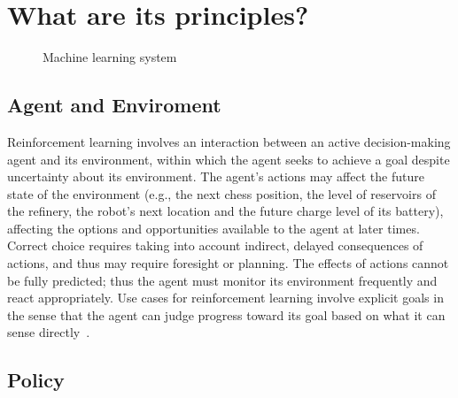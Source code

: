 \documentclass[letterpaper, 10 pt]{IEEEconf}
\begin{document}
\section{What are its principles?} %

\begin{figure}
\caption{Machine learning system}
\end{figure}

\subsection{Agent and Enviroment}

Reinforcement learning involves an interaction between an active
decision-making agent and its environment, within
which the agent seeks to achieve a goal despite uncertainty about its
environment. The agent’s actions may affect the future state of the
environment (e.g., the next chess position, the level of reservoirs of
the refinery, the robot’s next location and the future charge level of
its battery), affecting the options and opportunities available to the
agent at later times. Correct choice requires taking into account
indirect, delayed consequences of actions, and thus may require
foresight or planning. The effects of actions cannot be fully
predicted; thus the agent must monitor its environment frequently and
react appropriately. Use cases for reinforcement learning involve
explicit goals in the sense that the agent can judge progress toward
its goal based on what it can sense directly~\cite{sutton2018reinforcement}.

\subsection{Policy}
\end{document}
